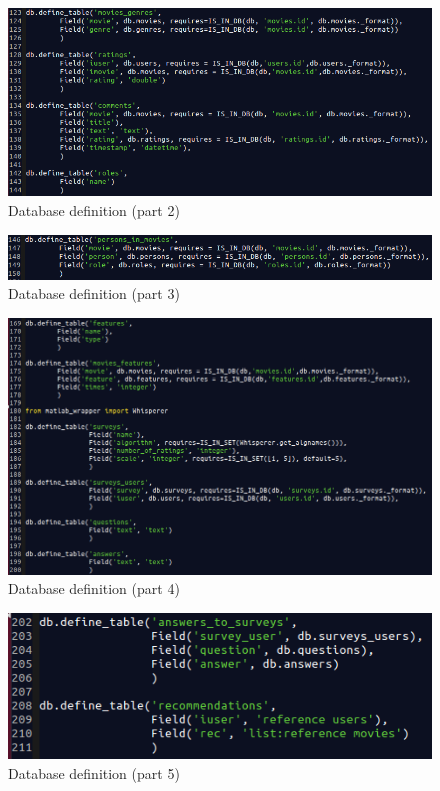 \begin{figure}
  \centering
  \includegraphics[width=\textwidth]{figures/db2.png}
  \caption{Database definition (part 2)}
  \label{fig:db2}
\end{figure}

\begin{figure}
  \centering
  \includegraphics[width=\textwidth]{figures/db3.png}
  \caption{Database definition (part 3)}
  \label{fig:db3}
\end{figure}

\begin{figure}
  \centering
  \includegraphics[width=\textwidth]{figures/db4.png}
  \caption{Database definition (part 4)}
  \label{fig:db4}
\end{figure}

\begin{figure}
  \centering
  \includegraphics[width=\textwidth]{figures/db5.png}
  \caption{Database definition (part 5)}
  \label{fig:db5}
\end{figure}

